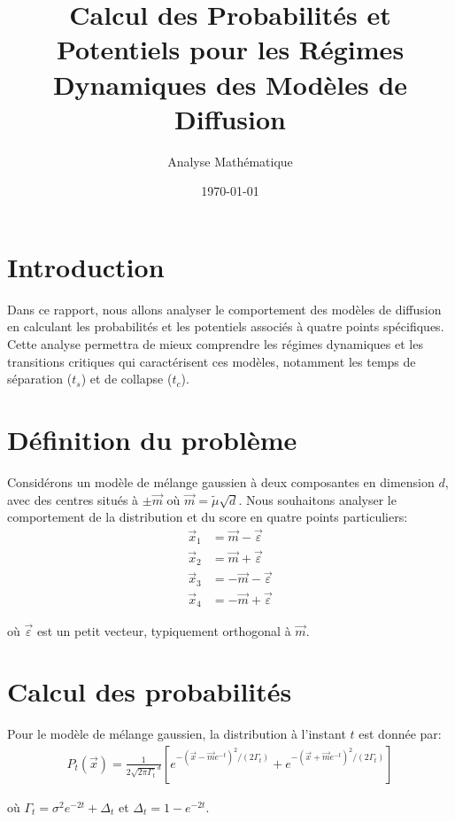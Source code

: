 \documentclass[11pt,a4paper]{article}
\title{Calcul des Probabilités et Potentiels pour les Régimes Dynamiques des Modèles de Diffusion}
\author{Analyse Mathématique}
\date{\today}
\begin{document}
\maketitle

\section{Introduction}

Dans ce rapport, nous allons analyser le comportement des modèles de diffusion en calculant les probabilités et les potentiels associés à quatre points spécifiques. Cette analyse permettra de mieux comprendre les régimes dynamiques et les transitions critiques qui caractérisent ces modèles, notamment les temps de séparation ($t_s$) et de collapse ($t_c$).

\section{Définition du problème}

Considérons un modèle de mélange gaussien à deux composantes en dimension $d$, avec des centres situés à $\pm \vec{m}$ où $\vec{m} = \tilde{\mu}\sqrt{d}$. Nous souhaitons analyser le comportement de la distribution et du score en quatre points particuliers:
\begin{align}
\vec{x}_1 &= \vec{m} - \vec{\varepsilon} \\
\vec{x}_2 &= \vec{m} + \vec{\varepsilon} \\
\vec{x}_3 &= -\vec{m} - \vec{\varepsilon} \\
\vec{x}_4 &= -\vec{m} + \vec{\varepsilon}
\end{align}

où $\vec{\varepsilon}$ est un petit vecteur, typiquement orthogonal à $\vec{m}$.

\section{Calcul des probabilités}

Pour le modèle de mélange gaussien, la distribution à l'instant $t$ est donnée par:
\begin{align}
P_t(\vec{x}) = \frac{1}{2\sqrt{2\pi\Gamma_t}^d}\left[
e^{-(\vec{x}-\vec{m} e^{-t})^2/(2 \Gamma_t)}
+e^{-(\vec{x}+\vec{m} e^{-t})^2/(2 \Gamma_t)}
\right]
\end{align}

où $\Gamma_t=\sigma^2 e^{-2t} + \Delta_t$ et $\Delta_t = 1-e^{-2t}$.
\end{document}
